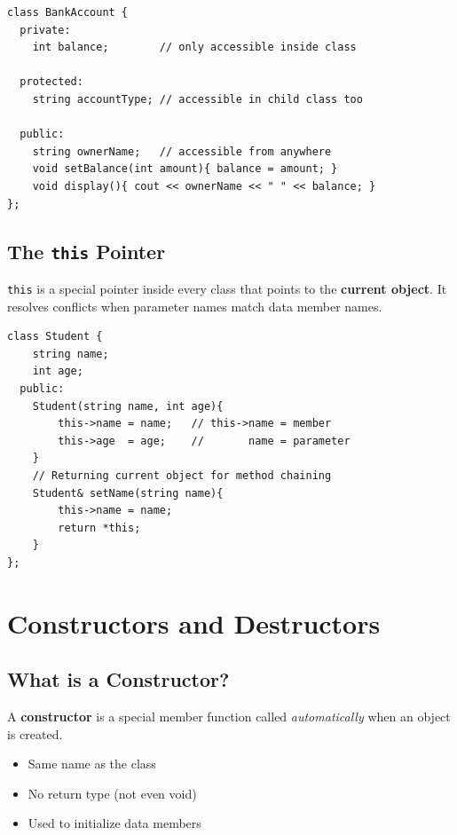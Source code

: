 \documentclass[12pt,a4paper]{report}
\begin{document}
\begin{lstlisting}[caption={Access Specifiers}]
class BankAccount {
  private:
    int balance;        // only accessible inside class

  protected:
    string accountType; // accessible in child class too

  public:
    string ownerName;   // accessible from anywhere
    void setBalance(int amount){ balance = amount; }
    void display(){ cout << ownerName << " " << balance; }
};
\end{lstlisting}

\section{The \texttt{this} Pointer}

\texttt{this} is a special pointer inside every class that points to the \textbf{current object}.
It resolves conflicts when parameter names match data member names.

\begin{lstlisting}[caption={this pointer}]
class Student {
    string name;
    int age;
  public:
    Student(string name, int age){
        this->name = name;   // this->name = member
        this->age  = age;    //       name = parameter
    }
    // Returning current object for method chaining
    Student& setName(string name){
        this->name = name;
        return *this;
    }
};
\end{lstlisting}

\chapter{Constructors and Destructors}

\section{What is a Constructor?}

A \textbf{constructor} is a special member function called \textit{automatically} when an object is created.

\begin{itemize}[leftmargin=*]
  \item Same name as the class
  \item No return type (not even void)
  \item Used to initialize data members
\end{itemize}
\end{document}
